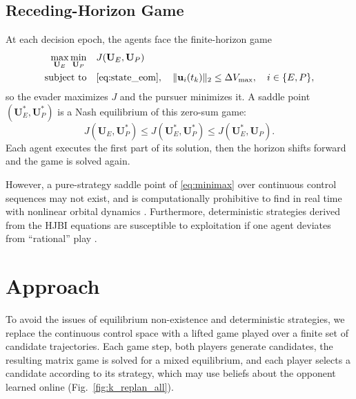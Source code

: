\documentclass[letterpaper, 10 pt, conference]{ieeeconf}  %
\begin{document}

\subsection{Receding-Horizon Game}

At each decision epoch, the agents face the finite-horizon game
%
\begin{equation}
    \begin{aligned}
    \max_{\mathbf{U}_E} \min_{\mathbf{U}_P} \quad & J(\mathbf{U}_E, \mathbf{U}_P) \\
    \text{subject to} \quad & \eqref{eq:state_eom}, \quad \|\mathbf{u}_i(t_k)\|_2 \leq \Delta V_{\max}, \quad i \in \{E, P\},
    \label{eq:minimax}
    \end{aligned}
\end{equation}
%
so the evader maximizes $J$ and the pursuer minimizes it. A saddle point $(\mathbf{U}_E^*, \mathbf{U}_P^*)$ is a Nash equilibrium of this zero-sum game:
%
\begin{equation}
J(\mathbf{U}_E, \mathbf{U}_P^*) \leq J(\mathbf{U}_E^*, \mathbf{U}_P^*) \leq J(\mathbf{U}_E^*, \mathbf{U}_P) .
\end{equation}
%
Each agent executes the first part of its solution, then the horizon shifts forward and the game is solved again.


However, a pure-strategy saddle point of \eqref{eq:minimax} over continuous control sequences may not exist, and is computationally prohibitive to find in real time with nonlinear orbital dynamics \cite{jia_approximate_2025}. Furthermore, deterministic strategies derived from the HJBI equations are susceptible to exploitation if one agent deviates from ``rational'' play \cite{krusniak_mixed_2025}.



\section{Approach}
\label{sec:methods}
% 

To avoid the issues of equilibrium non-existence and deterministic strategies, we replace the continuous control space with a lifted game played over a finite set of candidate trajectories. Each game step, both players generate candidates, the resulting matrix game is solved for a mixed equilibrium, and each player selects a candidate according to its strategy, which may use beliefs about the opponent learned online (Fig.~\ref{fig:k_replan_all}).
\end{document}
